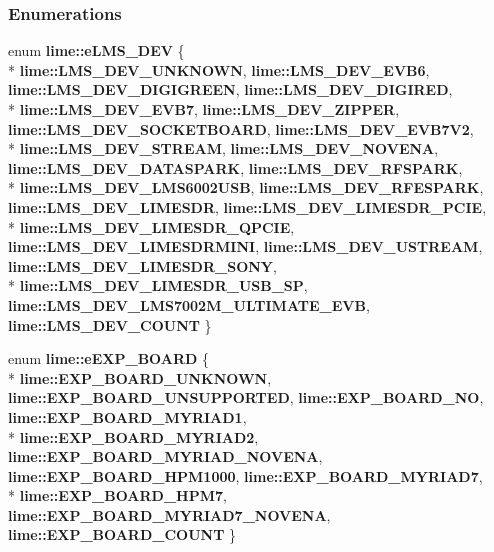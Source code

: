 \subsubsection*{Enumerations}
\begin{DoxyCompactItemize}
\item 
enum {\bf lime\+::e\+L\+M\+S\+\_\+\+D\+EV} \{ \\*
{\bf lime\+::\+L\+M\+S\+\_\+\+D\+E\+V\+\_\+\+U\+N\+K\+N\+O\+WN}, 
{\bf lime\+::\+L\+M\+S\+\_\+\+D\+E\+V\+\_\+\+E\+V\+B6}, 
{\bf lime\+::\+L\+M\+S\+\_\+\+D\+E\+V\+\_\+\+D\+I\+G\+I\+G\+R\+E\+EN}, 
{\bf lime\+::\+L\+M\+S\+\_\+\+D\+E\+V\+\_\+\+D\+I\+G\+I\+R\+ED}, 
\\*
{\bf lime\+::\+L\+M\+S\+\_\+\+D\+E\+V\+\_\+\+E\+V\+B7}, 
{\bf lime\+::\+L\+M\+S\+\_\+\+D\+E\+V\+\_\+\+Z\+I\+P\+P\+ER}, 
{\bf lime\+::\+L\+M\+S\+\_\+\+D\+E\+V\+\_\+\+S\+O\+C\+K\+E\+T\+B\+O\+A\+RD}, 
{\bf lime\+::\+L\+M\+S\+\_\+\+D\+E\+V\+\_\+\+E\+V\+B7\+V2}, 
\\*
{\bf lime\+::\+L\+M\+S\+\_\+\+D\+E\+V\+\_\+\+S\+T\+R\+E\+AM}, 
{\bf lime\+::\+L\+M\+S\+\_\+\+D\+E\+V\+\_\+\+N\+O\+V\+E\+NA}, 
{\bf lime\+::\+L\+M\+S\+\_\+\+D\+E\+V\+\_\+\+D\+A\+T\+A\+S\+P\+A\+RK}, 
{\bf lime\+::\+L\+M\+S\+\_\+\+D\+E\+V\+\_\+\+R\+F\+S\+P\+A\+RK}, 
\\*
{\bf lime\+::\+L\+M\+S\+\_\+\+D\+E\+V\+\_\+\+L\+M\+S6002\+U\+SB}, 
{\bf lime\+::\+L\+M\+S\+\_\+\+D\+E\+V\+\_\+\+R\+F\+E\+S\+P\+A\+RK}, 
{\bf lime\+::\+L\+M\+S\+\_\+\+D\+E\+V\+\_\+\+L\+I\+M\+E\+S\+DR}, 
{\bf lime\+::\+L\+M\+S\+\_\+\+D\+E\+V\+\_\+\+L\+I\+M\+E\+S\+D\+R\+\_\+\+P\+C\+IE}, 
\\*
{\bf lime\+::\+L\+M\+S\+\_\+\+D\+E\+V\+\_\+\+L\+I\+M\+E\+S\+D\+R\+\_\+\+Q\+P\+C\+IE}, 
{\bf lime\+::\+L\+M\+S\+\_\+\+D\+E\+V\+\_\+\+L\+I\+M\+E\+S\+D\+R\+M\+I\+NI}, 
{\bf lime\+::\+L\+M\+S\+\_\+\+D\+E\+V\+\_\+\+U\+S\+T\+R\+E\+AM}, 
{\bf lime\+::\+L\+M\+S\+\_\+\+D\+E\+V\+\_\+\+L\+I\+M\+E\+S\+D\+R\+\_\+\+S\+O\+NY}, 
\\*
{\bf lime\+::\+L\+M\+S\+\_\+\+D\+E\+V\+\_\+\+L\+I\+M\+E\+S\+D\+R\+\_\+\+U\+S\+B\+\_\+\+SP}, 
{\bf lime\+::\+L\+M\+S\+\_\+\+D\+E\+V\+\_\+\+L\+M\+S7002\+M\+\_\+\+U\+L\+T\+I\+M\+A\+T\+E\+\_\+\+E\+VB}, 
{\bf lime\+::\+L\+M\+S\+\_\+\+D\+E\+V\+\_\+\+C\+O\+U\+NT}
 \}
\item 
enum {\bf lime\+::e\+E\+X\+P\+\_\+\+B\+O\+A\+RD} \{ \\*
{\bf lime\+::\+E\+X\+P\+\_\+\+B\+O\+A\+R\+D\+\_\+\+U\+N\+K\+N\+O\+WN}, 
{\bf lime\+::\+E\+X\+P\+\_\+\+B\+O\+A\+R\+D\+\_\+\+U\+N\+S\+U\+P\+P\+O\+R\+T\+ED}, 
{\bf lime\+::\+E\+X\+P\+\_\+\+B\+O\+A\+R\+D\+\_\+\+NO}, 
{\bf lime\+::\+E\+X\+P\+\_\+\+B\+O\+A\+R\+D\+\_\+\+M\+Y\+R\+I\+A\+D1}, 
\\*
{\bf lime\+::\+E\+X\+P\+\_\+\+B\+O\+A\+R\+D\+\_\+\+M\+Y\+R\+I\+A\+D2}, 
{\bf lime\+::\+E\+X\+P\+\_\+\+B\+O\+A\+R\+D\+\_\+\+M\+Y\+R\+I\+A\+D\+\_\+\+N\+O\+V\+E\+NA}, 
{\bf lime\+::\+E\+X\+P\+\_\+\+B\+O\+A\+R\+D\+\_\+\+H\+P\+M1000}, 
{\bf lime\+::\+E\+X\+P\+\_\+\+B\+O\+A\+R\+D\+\_\+\+M\+Y\+R\+I\+A\+D7}, 
\\*
{\bf lime\+::\+E\+X\+P\+\_\+\+B\+O\+A\+R\+D\+\_\+\+H\+P\+M7}, 
{\bf lime\+::\+E\+X\+P\+\_\+\+B\+O\+A\+R\+D\+\_\+\+M\+Y\+R\+I\+A\+D7\+\_\+\+N\+O\+V\+E\+NA}, 
{\bf lime\+::\+E\+X\+P\+\_\+\+B\+O\+A\+R\+D\+\_\+\+C\+O\+U\+NT}
 \}
\end{DoxyCompactItemize}
